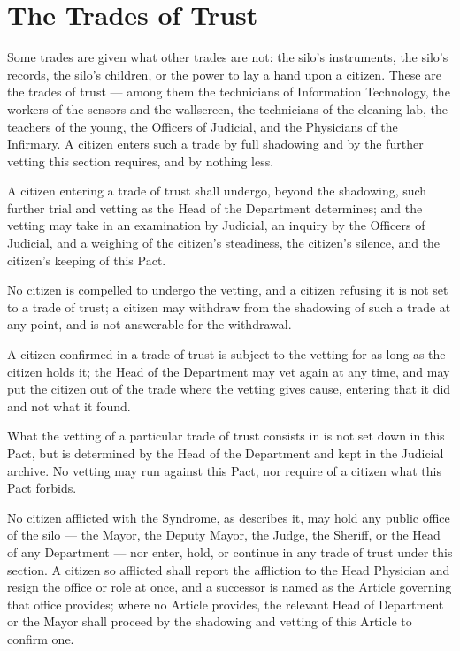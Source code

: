 \section{The Trades of Trust}
\label{sec:labor:trades-of-trust}

Some trades are given what other trades are not: the silo's instruments, the silo's records, the silo's children, or the power to lay a hand upon a citizen. These are the trades of trust --- among them the technicians of Information Technology, the workers of the sensors and the wallscreen, the technicians of the cleaning lab, the teachers of the young, the Officers of Judicial, and the Physicians of the Infirmary. A citizen enters such a trade by full shadowing and by the further vetting this section requires, and by nothing less.

\begin{clauses}
\item A citizen entering a trade of trust shall undergo, beyond the shadowing, such further trial and vetting as the Head of the Department determines; and the vetting may take in an examination by Judicial, an inquiry by the Officers of Judicial, and a weighing of the citizen's steadiness, the citizen's silence, and the citizen's keeping of this Pact.
\item No citizen is compelled to undergo the vetting, and a citizen refusing it is not set to a trade of trust; a citizen may withdraw from the shadowing of such a trade at any point, and is not answerable for the withdrawal.
\item A citizen confirmed in a trade of trust is subject to the vetting for as long as the citizen holds it; the Head of the Department may vet again at any time, and may put the citizen out of the trade where the vetting gives cause, entering that it did and not what it found.
\item What the vetting of a particular trade of trust consists in is not set down in this Pact, but is determined by the Head of the Department and kept in the Judicial archive. No vetting may run against this Pact, nor require of a citizen what this Pact forbids.
\item No citizen afflicted with the Syndrome, as  describes it, may hold any public office of the silo --- the Mayor, the Deputy Mayor, the Judge, the Sheriff, or the Head of any Department --- nor enter, hold, or continue in any trade of trust under this section. A citizen so afflicted shall report the affliction to the Head Physician and resign the office or role at once, and a successor is named as the Article governing that office provides; where no Article provides, the relevant Head of Department or the Mayor shall proceed by the shadowing and vetting of this Article to confirm one.
\end{clauses}

